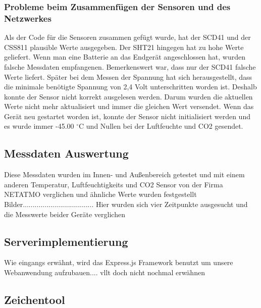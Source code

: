 \documentclass[]{article}
\begin{document}
			\subsubsection{Probleme beim Zusammenfügen der Sensoren und des Netzwerkes}
			Als der Code für die Sensoren zusammen gefügt wurde, hat der SCD41 und der CSS811 plausible Werte ausgegeben. Der SHT21 hingegen hat zu hohe Werte geliefert. Wenn man eine Batterie an das Endgerät angeschlossen hat, wurden falsche Messdaten empfangenen. Bemerkenswert war, dass nur der SCD41 falsche Werte liefert. Später bei dem Messen der Spannung hat sich herausgestellt, dass die minimale benötigte Spannung von 2,4 Volt unterschritten worden ist. Deshalb konnte der Sensor nicht korrekt ausgelesen werden. Darum wurden die aktuellen Werte nicht mehr aktualisiert und immer die gleichen Wert versendet. Wenn das Gerät neu gestartet worden ist, konnte der Sensor nicht initialisiert werden und es wurde immer -45.00 $^\circ$C und Nullen bei der Luftfeuchte und CO2 gesendet.
			
			
			\subsection{Messdaten Auswertung}
			Diese Messdaten wurden im Innen- und Außenbereich getestet und mit einem anderen Temperatur, Luftfeuchtigkeits und CO2 Sensor von der Firma NETATMO verglichen und ähnliche Werte wurden festgestellt Bilder....................................
			Hier wurden sich vier Zeitpunkte ausgesucht und die Messwerte beider Geräte verglichen
			
			
					
			\subsection{Serverimplementierung}
				Wie eingangs erwähnt, wird das Express.js Framework benutzt um unsere Webanwendung aufzubauen.... vllt doch nicht nochmal erwähnen
			
			\subsection{Zeichentool}
\end{document}
